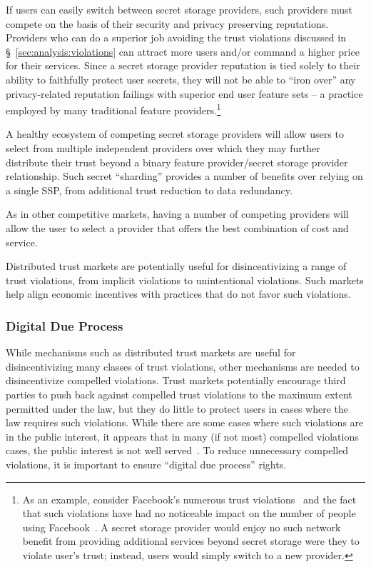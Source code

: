 \begin{packed_desc}
\item[Reputation:] If users can easily switch between secret storage
  providers, such providers must compete on the basis of their
  security and privacy preserving reputations. Providers who can do a
  superior job avoiding the trust violations discussed in
  \S~\ref{sec:analysis:violations} can attract more users and/or
  command a higher price for their services. Since a secret storage
  provider reputation is tied solely to their ability to faithfully
  protect user secrets, they will not be able to ``iron over'' any
  privacy-related reputation failings with superior end user feature
  sets -- a practice employed by many traditional feature
  providers.\footnote{As an example, consider Facebook's numerous
    trust violations~\cite{goel2014, lomas2014, tsukayama2014} and the
    fact that such violations have had no noticeable impact on the
    number of people using Facebook~\cite{foster2014}. A secret
    storage provider would enjoy no such network benefit from
    providing additional services beyond secret storage were they to
    violate user's trust; instead, users would simply switch to a new
    provider.}
\item[Multiple Providers:] A healthy ecosystem of competing secret
  storage providers will allow users to select from multiple
  independent providers over which they may further distribute their
  trust beyond a binary feature provider/secret storage provider
  relationship. Such secret ``sharding'' provides a number of benefits
  over relying on a single SSP, from additional trust reduction to
  data redundancy.
\item[Cost:] As in other competitive markets, having a number of
  competing providers will allow the user to select a provider that
  offers the best combination of cost and service.
\end{packed_desc}

Distributed trust markets are potentially useful for disincentivizing
a range of trust violations, from implicit violations to unintentional
violations. Such markets help align economic incentives with practices
that do not favor such violations.

\subsubsection{Digital Due Process}

While mechanisms such as distributed trust markets are useful for
disincentivizing many classes of trust violations, other mechanisms
are needed to disincentivize compelled violations. Trust markets
potentially encourage third parties to push back against compelled
trust violations to the maximum extent permitted under the law, but
they do little to protect users in cases where the law requires such
violations. While there are some cases where such violations are in
the public interest, it appears that in many (if not most) compelled
violations cases, the public interest is not well
served~\cite{greenwald-collect, greenwald-prism}. To reduce
unnecessary compelled violations, it is important to ensure ``digital
due process'' rights.

